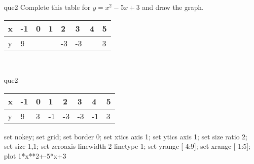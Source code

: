 \documentclass[13.5pt, varwidth=true]{beamer}
\begin{document}
\begin{frame}[shrink=19,fragile]
	\begin{beamercolorbox}[rounded=true, left, shadow=true,wd=14.8cm]{que2}
		 Complete this table for $y = x^{2} - 5x + 3$ and draw the graph. \\[0.3cm] \renewcommand{\arraystretch}{1.2}\begin{tabular}{|C|C|C|C|C|C|C|C|} \hline x & -1 & 0 & 1 & 2 & 3 & 4 & 5 \\ \hline y & 9 &  &  & -3 & -3 &  & 3\\ \hline \end{tabular}\\[0.3cm]
	\end{beamercolorbox}
\end{frame}
\begin{frame}[shrink=19,fragile]
	\begin{beamercolorbox}[rounded=true, left, shadow=true,wd=14.8cm]{que2}
		\renewcommand{\arraystretch}{1.2}\begin{tabular}{|C|C|C|C|C|C|C|C|} \hline x & -1 & 0 & 1 & 2 & 3 & 4 & 5 \\ \hline y & 9 & 3 & -1 & -3 & -3 & -1 & 3\\ \hline \end{tabular}\begin{gnuplot}[terminal=pdf] set nokey; set grid; set border 0; set xtics axis 1; set ytics axis 1; set size ratio 2; set size 1,1; set zeroaxis linewidth 2 linetype 1; set yrange [-4:9]; set xrange [-1:5]; plot 1*x**2+-5*x+3 \end{gnuplot}
	\end{beamercolorbox}
\end{frame}
\end{document}

